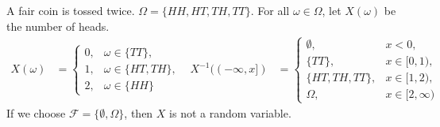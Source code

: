 \documentclass{huhtakm-template-book-v2}
\begin{document}
    \begin{eg}
        \label{Chapter 3 (Example) Toss coin twice}
        A fair coin is tossed twice. $\Omega = \{HH,HT,TH,TT\}$. For all $\omega \in \Omega$, let $X(\omega)$ be the number of heads.
        \begin{align*}
            X(\omega) &= \begin{cases}
                0, &\omega \in \{TT\},\\
                1, &\omega \in \{HT,TH\},\\
                2, &\omega \in \{HH\}
            \end{cases} & X^{-1}((-\infty,x]) &= \begin{cases}
                \emptyset, & x < 0,\\
                \{TT\}, & x \in [0,1),\\
                \{HT,TH,TT\}, & x \in [1,2),\\
                \Omega, &x \in [2,\infty)
            \end{cases}
        \end{align*}
        If we choose $\mathcal{F} = \{\emptyset,\Omega\}$, then $X$ is not a random variable.
    \end{eg}
    \newpage
\end{document}
